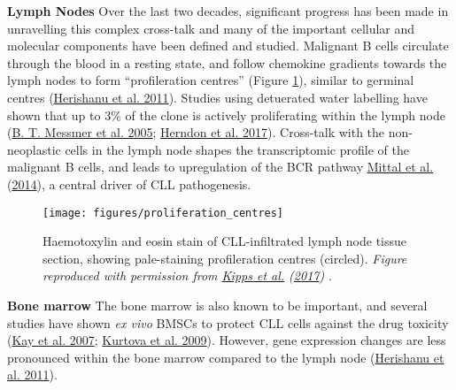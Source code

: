 \documentclass[11pt, a4paper, twosided]{book}
\begin{document}
\textbf{Lymph Nodes}
Over the last two decades, significant progress has been made in unravelling this complex cross-talk and many of the important cellular and molecular components have been defined and studied. Malignant B cells circulate through the blood in a resting state, and follow chemokine gradients towards the lymph nodes to form ``profileration centres'' (Figure \ref{fig:proliferationCentres}), similar to germinal centres (\protect\hyperlink{ref-Herishanu2011}{Herishanu et al. 2011}). Studies using detuerated water labelling have shown that up to 3\% of the clone is actively proliferating within the lymph node (\protect\hyperlink{ref-Messmer2005}{B. T. Messmer et al. 2005}; \protect\hyperlink{ref-Herndon2017}{Herndon et al. 2017}). Cross-talk with the non-neoplastic cells in the lymph node shapes the transcriptomic profile of the malignant B cells, and leads to upregulation of the BCR pathway \protect\hyperlink{ref-Mittal2014}{Mittal et al.} (\protect\hyperlink{ref-Mittal2014}{2014}), a central driver of CLL pathogenesis.


\begin{figure}

{\centering \texttt{[image: figures/proliferation\_centres]} 

}

\caption{Haemotoxylin and eosin stain of CLL-infiltrated lymph node tissue section, showing pale-staining profileration centres (circled). \emph{Figure reproduced with permission from \protect\hyperlink{ref-Kipps2017}{Kipps et al.} (\protect\hyperlink{ref-Kipps2017}{2017}) }.}\label{fig:proliferationCentres}
\end{figure}
\textbf{Bone marrow}
The bone marrow is also known to be important, and several studies have shown \emph{ex vivo} BMSCs to protect CLL cells against the drug toxicity (\protect\hyperlink{ref-Kay2007}{Kay et al. 2007}; \protect\hyperlink{ref-Kurtova2009}{Kurtova et al. 2009}). However, gene expression changes are less pronounced within the bone marrow compared to the lymph node (\protect\hyperlink{ref-Herishanu2011}{Herishanu et al. 2011}).
\end{document}
